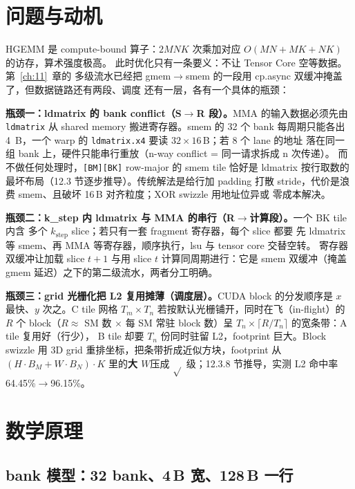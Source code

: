 \section{问题与动机}

HGEMM 是 compute-bound 算子：$2MNK$ 次乘加对应 $O(MN+MK+NK)$ 的访存，算术强度极高。
此时优化只有一条要义：不让 Tensor Core 空等数据。第~\ref{ch:11}~章的
多级流水已经把 gmem$\to$smem 的一段用 cp.async 双缓冲掩盖了，但数据链路还有两段、调度
还有一层，各有一个具体的瓶颈：

\textbf{瓶颈一：ldmatrix 的 bank conflict（S$\to$R 段）。}\allowbreak{}MMA 的输入数据必须先由
\texttt{ldmatrix} 从 shared memory 搬进寄存器。smem 的 32 个 bank 每周期只能各出
4~B，一个 warp 的 \texttt{ldmatrix.x4} 要读 $32\times16$\,B；若 8 个 lane 的地址
落在同一组 bank 上，硬件只能串行重放（n-way conflict = 同一请求拆成 n 次传递）。
而不做任何处理时，\texttt{[BM][BK]} row-major 的 smem tile 恰好是 ldmatrix
按行取数的最坏布局（12.3 节逐步推导）。传统解法是给行加 padding 打散
stride，代价是浪费 smem、且破坏 16\,B 对齐粒度；XOR swizzle 用地址位异或
零成本解决。

\textbf{瓶颈二：k\_step 内 ldmatrix 与 MMA 的串行（R$\to$计算段）。}一个 BK tile 内含
多个 $k_{\mathrm{step}}$ slice；若只有一套 fragment 寄存器，每个 slice 都要
先 ldmatrix 等 smem、再 MMA 等寄存器，顺序执行，lsu 与 tensor core 交替空转。
寄存器双缓冲让加载 slice $t{+}1$ 与用 slice $t$ 计算同周期进行：它是
smem 双缓冲（掩盖 gmem 延迟）之下的第二级流水，两者分工明确。

\textbf{瓶颈三：grid 光栅化把 L2 复用摊薄（调度层）。}\allowbreak{}CUDA block 的分发顺序是
$x$ 最快、$y$ 次之。C tile 网格 $T_m\times T_n$ 若按默认光栅铺开，同时在飞（in-flight）的
$R$ 个 block（$R\approx$ SM 数 $\times$ 每 SM 常驻 block 数）呈
$T_n\times\lceil R/T_n\rceil$ 的宽条带：A tile 复用好（行少），
B tile 却要 $T_n$ 份同时驻留 L2，footprint 巨大。Block swizzle 用 3D grid
重排坐标，把条带折成近似方块，footprint 从 $(H\!\cdot\!B_M+W\!\cdot\!B_N)\cdot K$
里的\textbf{大 $W$}压成 $\sqrt{}$ 级；12.3.8 节推导，实测 L2 命中率 64.45\%$\to$96.15\%。

\section{数学原理}

\subsection{bank 模型：32 bank、4\,B 宽、128\,B 一行}

